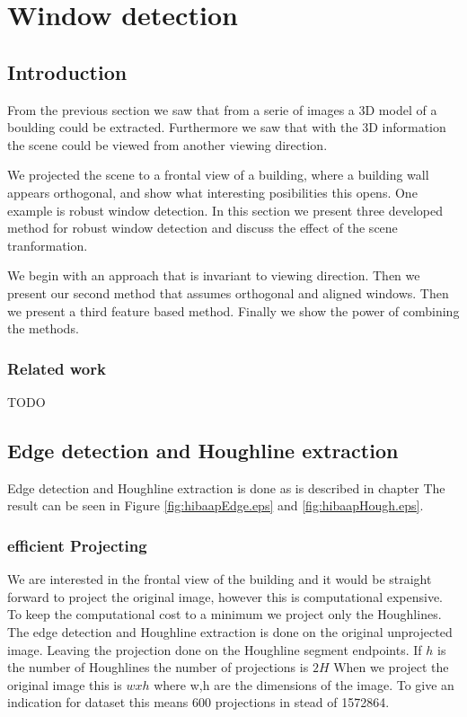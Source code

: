 \section{Window detection}
\label{chap:windowDetection}
\subsection{Introduction}
From the previous section we saw that from a serie of images a 3D model of a
boulding could be extracted. Furthermore we saw that with the 3D information the
scene could be viewed from another viewing direction. 

We projected the scene to a frontal view of a building, where a building wall appears
orthogonal, and show what interesting posibilities this opens.
One example is robust window detection.
In this section we present three developed method for robust window detection
and discuss the effect of the scene tranformation.

We begin with an approach that is invariant to viewing direction.  Then we
present our second method that assumes orthogonal and aligned windows.  Then we
present a third feature based method.  Finally we show the power of combining
the methods.



\subsubsection{Related work}
TODO

\subsection{Edge detection and Houghline extraction} 
Edge detection and Houghline extraction is done as is described in chapter
The result can be seen in Figure \ref{fig:hibaapEdge.eps} and
\ref{fig:hibaapHough.eps}.
\subsubsection{efficient Projecting} 
We are interested in the frontal view of the building and it would be straight
forward to project the original image, however this is computational
expensive. To keep the computational cost to a minimum we project only the
Houghlines. The edge detection and Houghline extraction is done on the original
unprojected image. Leaving the projection done on the Houghline segment
endpoints. If $h$ is the number of Houghlines the number of projections is $2H$
When we project the original image this is $wxh$ where w,h are the dimensions of
the image. To give an indication for dataset %
this means 600 projections in stead of 1572864.

